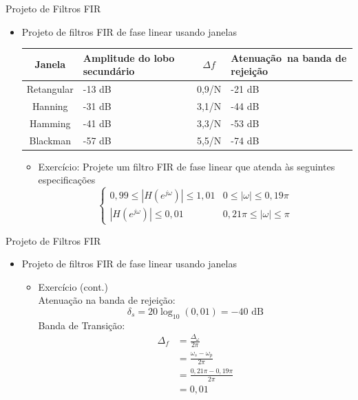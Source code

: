 \begin{slide}{Projeto de Filtros FIR}
\begin{itemize}
   \item  Projeto de filtros FIR de fase linear usando janelas 
   \begin{tabular}{c|p{8cm}|c|p{8cm}}
      \hline\hline
      Janela & Amplitude do lobo secundário & $\Delta f$ & Atenuação~na banda de rejeição\\
      \hline\hline
      Retangular & -13 dB & 0,9/N & -21 dB\\
      Hanning     & -31 dB & 3,1/N & -44 dB \\
      Hamming  & -41 dB  & 3,3/N & -53 dB\\
      Blackman  & -57 dB & 5,5/N & -74 dB\\
      \hline\hline
   \end{tabular}%
   \begin{itemize} 
      \item Exercício: Projete um filtro FIR de fase linear que atenda às seguintes especificações
      \begin{equation*}\begin{cases}
         0,99\leq |H(e^{j\omega})| \leq 1,01 & 0\leq |\omega| \leq 0,19\pi\\
          |H(e^{j\omega})| \leq 0,01 & 0,21\pi\leq |\omega| \leq \pi
          \end{cases}
       \end{equation*}
   \end{itemize}
\end{itemize}
\end{slide}

\begin{slide}{Projeto de Filtros FIR}
\begin{itemize}
   \item  Projeto de filtros FIR de fase linear usando janelas 
   \begin{itemize} 
      \item Exercício (cont.)\\
      Atenuação na banda de rejeição:
      \begin{equation*}
         \delta_s = 20\log_{10}(0,01) =  -40 \text{ dB}
      \end{equation*}
      Banda de Transição:
      \begin{align*}
         \Delta_f &= \frac{\Delta_\omega}{2\pi}\\ &= \frac{\omega_s -\omega_p}{2\pi}\\&= \frac{0,21\pi - 0,19\pi}{2\pi}\\&=0,01
      \end{align*}
   \end{itemize}
\end{itemize}
\end{slide}

